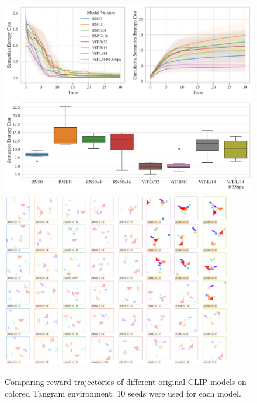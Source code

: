 \begin{figure}[H]
    \centering    
    \includegraphics[width=\textwidth]{images/model_comparison_color.pdf}
    \includegraphics[width=\textwidth]{images/model_comparison_boxplot_color.pdf}
    \includegraphics[width=0.9\textwidth]{images/model_samples_color.pdf}
    \caption[Comparing reward trajectories of different original CLIP models on colored Tangram environment.]{Comparing reward trajectories of different original CLIP models on colored Tangram environment. 10 seeds were used for each model.}
    \label{fig:clip-traj-comparison-color}
\end{figure}


